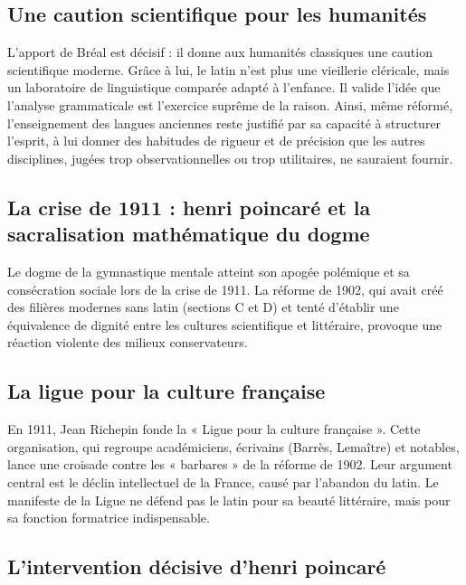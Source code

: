 \subsection{Une caution scientifique pour les humanités}

L'apport de Bréal est décisif : il donne aux humanités classiques une caution scientifique moderne.
Grâce à lui, le latin n'est plus une vieillerie cléricale, mais un laboratoire de linguistique
comparée adapté à l'enfance. Il valide l'idée que l'analyse grammaticale est l'exercice suprême de
la raison. Ainsi, même réformé, l'enseignement des langues anciennes reste justifié par sa capacité
à structurer l'esprit, à lui donner des habitudes de rigueur et de précision que les autres
disciplines, jugées trop observationnelles ou trop utilitaires, ne sauraient
fournir.\cite{I-1-3-ref12}



\subsection{La crise de 1911 : henri poincaré et la sacralisation mathématique du dogme}

Le dogme de la gymnastique mentale atteint son apogée polémique et sa consécration sociale lors de
la crise de 1911. La réforme de 1902, qui avait créé des filières modernes sans latin (sections C et
D) et tenté d'établir une équivalence de dignité entre les cultures scientifique et littéraire,
provoque une réaction violente des milieux conservateurs.\cite{I-1-3-ref14}



\subsection{La ligue pour la culture française}

En 1911, Jean Richepin fonde la « Ligue pour la culture française ». Cette organisation, qui
regroupe académiciens, écrivains (Barrès, Lemaître) et notables, lance une croisade contre les «
barbares » de la réforme de 1902. Leur argument central est le déclin intellectuel de la France,
causé par l'abandon du latin.\cite{I-1-3-ref17} Le manifeste de la Ligue ne défend pas le latin pour
sa beauté littéraire, mais pour sa fonction formatrice indispensable.



\subsection{L'intervention décisive d'henri poincaré}

